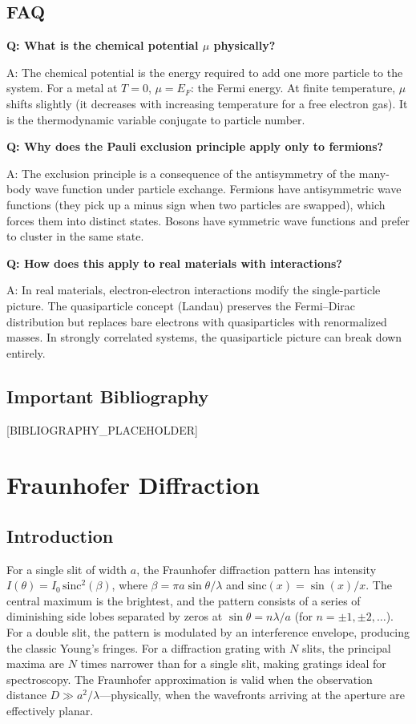 \documentclass[11pt,openright]{book}
\begin{document}
\section*{FAQ}

\textbf{Q: What is the chemical potential $\mu$ physically?}

A: The chemical potential is the energy required to add one more particle to the system. For a metal at $T = 0$, $\mu = E_F$: the Fermi energy. At finite temperature, $\mu$ shifts slightly (it decreases with increasing temperature for a free electron gas). It is the thermodynamic variable conjugate to particle number.

\textbf{Q: Why does the Pauli exclusion principle apply only to fermions?}

A: The exclusion principle is a consequence of the antisymmetry of the many-body wave function under particle exchange. Fermions have antisymmetric wave functions (they pick up a minus sign when two particles are swapped), which forces them into distinct states. Bosons have symmetric wave functions and prefer to cluster in the same state.

\textbf{Q: How does this apply to real materials with interactions?}

A: In real materials, electron-electron interactions modify the single-particle picture. The quasiparticle concept (Landau) preserves the Fermi--Dirac distribution but replaces bare electrons with quasiparticles with renormalized masses. In strongly correlated systems, the quasiparticle picture can break down entirely.
\section*{Important Bibliography}

[BIBLIOGRAPHY_PLACEHOLDER]


\chapter{Fraunhofer Diffraction}

\section*{Introduction}

For a single slit of width $a$, the Fraunhofer diffraction pattern has intensity $I(\theta) = I_0\,\text{sinc}^2(\beta)$, where $\beta = \pi a \sin\theta/\lambda$ and $\text{sinc}(x) = \sin(x)/x$. The central maximum is the brightest, and the pattern consists of a series of diminishing side lobes separated by zeros at $\sin\theta = n\lambda/a$ (for $n = \pm 1, \pm 2, \ldots$). For a double slit, the pattern is modulated by an interference envelope, producing the classic Young's fringes. For a diffraction grating with $N$ slits, the principal maxima are $N$ times narrower than for a single slit, making gratings ideal for spectroscopy. The Fraunhofer approximation is valid when the observation distance $D \gg a^2/\lambda$---physically, when the wavefronts arriving at the aperture are effectively planar.
\end{document}
